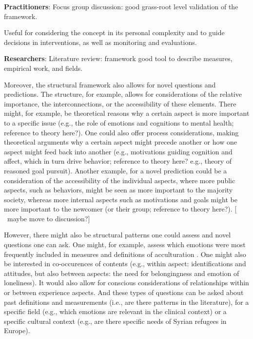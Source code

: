 \documentclass[man, 12pt, a4paper]{apa7}
\newcommand\Warning[1][2ex]{%
  \renewcommand\stacktype{L}%
  \scaleto{\stackon[1.3pt]{\color{red}$\triangle$}{\tiny\bfseries !}}{#1}}%
\begin{document}
\vspace{1em}
\textbf{Practitioners}: Focus group discussion: good grass-root level validation of the framework.

Useful for considering the concept in its personal complexity and to guide decisions in interventions, as well as monitoring and evaluations. 

\textbf{Researchers}: Literature review: framework good tool to describe measures, empirical work, and fields.

Moreover, the structural framework also allows for novel questions and predictions. The structure, for example, allows for considerations of the relative importance, the interconnections, or the accessibility of these elements. There might, for example, be theoretical reasons why a certain aspect is more important to a specific issue (e.g., the role of emotions and cognitions to mental health; reference to theory here?). One could also offer process considerations, making theoretical arguments why a certain aspect might precede another or how one aspect might feed back into another (e.g., motivations guiding cognition and affect, which in turn drive behavior; reference to theory here? e.g., theory of reasoned goal pursuit). Another example, for a novel prediction could be a consideration of the accessibility of the individual aspects, where more public aspects, such as behaviors, might be seen as more important to the majority society, whereas more internal aspects such as motivations and goals might be more important to the newcomer (or their group; reference to theory here?). [\Warning\ maybe move to discussion?]

However, there might also be structural patterns one could assess and novel questions one can ask. One might, for example, assess which emotions were most frequently included in measures and definitions of acculturation \citep[e.g., specific emotions such as anger or pride, but also types of emotions, such as positive or negative, or about yourself or others;][]{DeLeersnyder2017}. One might also be interested in co-occurences of contents (e.g., within aspect: identifications and attitudes, but also between aspects: the need for belongingness and emotion of loneliness). It would also allow for conscious considerations of relationships within or between experience aspects. And these types of questions can be asked about past definitions and measurements (i.e., are there patterns in the literature), for a specific field (e.g., which emotions are relevant in the clinical context) or a specific cultural context (e.g., are there specific needs of Syrian refugees in Europe). 
\end{document}
